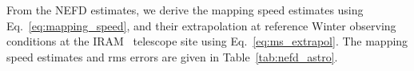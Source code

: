 
From the NEFD estimates, we derive the mapping speed estimates using
Eq.~\ref{eq:mapping_speed}, and their extrapolation at reference Winter
observing conditions at the IRAM \trentemetre\ telescope site using
Eq.~\ref{eq:ms_extrapol}. The mapping speed estimates and rms errors
are given in Table~\ref{tab:nefd_astro}.


